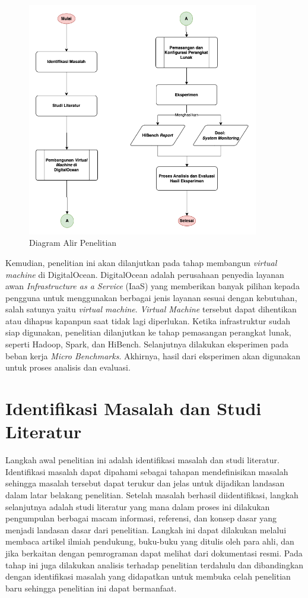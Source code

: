 \begin{figure}[h!]
    \centering
    \includegraphics[width=0.9\textwidth]{figures/ch03/Diagram Tugas Akhir.png}
    \caption{Diagram Alir Penelitian}
    \label{fig:diagram alir}
\end{figure}

\newpage
Kemudian, penelitian ini akan dilanjutkan pada tahap membangun \textit{virtual machine} di DigitalOcean. DigitalOcean adalah perusahaan penyedia layanan awan \textit{Infrastructure as a Service} (IaaS) yang memberikan banyak pilihan kepada pengguna untuk menggunakan berbagai jenis layanan sesuai dengan kebutuhan, salah satunya yaitu \textit{virtual machine}. \textit{Virtual Machine} tersebut dapat dihentikan atau dihapus kapanpun saat tidak lagi diperlukan. Ketika infrastruktur sudah siap digunakan, penelitian dilanjutkan ke tahap pemasangan perangkat lunak, seperti Hadoop, Spark, dan HiBench. Selanjutnya dilakukan eksperimen pada beban kerja \textit{Micro Benchmarks}. Akhirnya, hasil dari eksperimen akan digunakan untuk proses analisis dan evaluasi.

\section{Identifikasi Masalah dan Studi Literatur}
Langkah awal penelitian ini adalah identifikasi masalah dan studi literatur. Identifikasi masalah dapat dipahami sebagai tahapan mendefinisikan masalah sehingga masalah tersebut dapat terukur dan jelas untuk dijadikan landasan dalam latar belakang penelitian. Setelah masalah berhasil diidentifikasi, langkah selanjutnya adalah studi literatur yang mana dalam proses ini dilakukan pengumpulan berbagai macam informasi, referensi, dan konsep dasar yang menjadi landasan dasar dari penelitian. Langkah ini dapat dilakukan melalui membaca artikel ilmiah pendukung, buku-buku yang ditulis oleh para ahli, dan jika berkaitan dengan pemrograman dapat melihat dari dokumentasi resmi. Pada tahap ini juga dilakukan analisis terhadap penelitian terdahulu dan dibandingkan dengan identifikasi masalah yang didapatkan untuk membuka celah penelitian baru sehingga penelitian ini dapat bermanfaat. 


